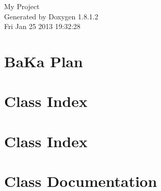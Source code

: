 \documentclass{book}
\begin{document}
\hypersetup{pageanchor=false,citecolor=blue}
\begin{titlepage}
\vspace*{7cm}
\begin{center}
{\Large My Project }\\
\vspace*{1cm}
{\large Generated by Doxygen 1.8.1.2}\\
\vspace*{0.5cm}
{\small Fri Jan 25 2013 19:32:28}\\
\end{center}
\end{titlepage}
\clearemptydoublepage
{}
\tableofcontents
\clearemptydoublepage
{}
\hypersetup{pageanchor=true,citecolor=blue}
\chapter{Ba\-Ka Plan}
\label{md_README}
\hypertarget{md_README}{}

\chapter{Class Index}

\chapter{Class Index}

\chapter{Class Documentation}














\printindex
\end{document}
